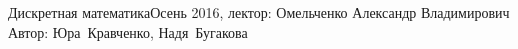 


\BigHeader
	{Дискретная математика}{Осень 2016, лектор: Омельченко Александр Владимирович}
	{Автор: Юра~Кравченко, Надя~Бугакова}



